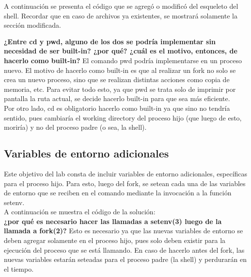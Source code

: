 \documentclass[a4paper, 12pt]{article}
\begin{document}
		A continuación se presenta el código que se agregó o modificó del esqueleto del shell. Recordar que en caso de archivos ya existentes, se mostrará solamente la sección modificada.\\
		
		\bigskip\bigskip\bigskip
		
		\bigskip\bigskip\bigskip
		
		
		\textbf{¿Entre cd y pwd, alguno de los dos se podría implementar sin necesidad de ser built-in? ¿por qué? ¿cuál es el motivo, entonces, de hacerlo como built-in?} El comando pwd podría implementarse en un proceso nuevo. El motivo de hacerlo como built-in es que al realizar un fork no solo se crea un nuevo proceso, sino que se realizan distintas acciones como copia de memoria, etc. Para evitar todo esto, ya que pwd se trata solo de imprimir por pantalla la ruta actual, se decide hacerlo built-in para que sea más eficiente. \\
		Por otro lado, cd es obligatorio hacerlo como built-in ya que sino no tendría sentido, pues cambiaría el working directory del proceso hijo (que luego de esto, moriría) y no del proceso padre (o sea, la shell).
		
		\subsection{Variables de entorno adicionales}
		Este objetivo del lab consta de incluir variables de entorno adicionales, específicas para el proceso hijo. Para esto, luego del fork, se setean cada una de las variables de entorno que se reciben en el comando mediante la invocación a la función setenv.\\
		
		A continuación se muestra el código de la solución:\\
		
		
		\textbf{¿por qué es necesario hacer las llamadas a setenv(3) luego de la llamada a fork(2)?} Esto es necesario ya que las nuevas variables de entorno se deben agregar solamente en el proceso hijo, pues solo deben existir para la ejecución del proceso que se está llamando. En caso de hacerlo antes del fork, las nuevas variables estarán seteadas para el proceso padre (la shell) y perdurarán en el tiempo.\\
		
\end{document}
